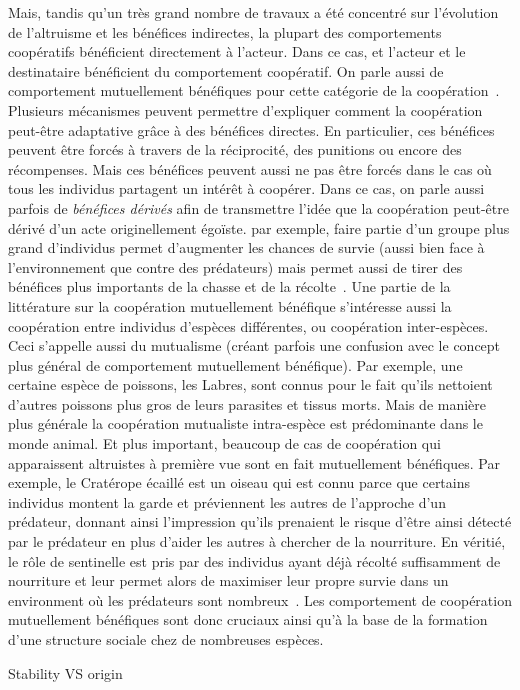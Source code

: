 		Mais, tandis qu'un très grand nombre de travaux a été concentré sur l'évolution de l'altruisme et les bénéfices indirectes, la plupart des comportements coopératifs bénéficient directement à l'acteur. Dans ce cas, et l'acteur et le destinataire bénéficient du comportement coopératif. On parle aussi de comportement mutuellement bénéfiques pour cette catégorie de la coopération~\parencite{Bergmuller2007a}. Plusieurs mécanismes peuvent permettre d'expliquer comment la coopération peut-être adaptative grâce à des bénéfices directes. En particulier, ces bénéfices peuvent être forcés à travers de la réciprocité, des punitions ou encore des récompenses. Mais ces bénéfices peuvent aussi ne pas être forcés dans le cas où tous les individus partagent un intérêt à coopérer. Dans ce cas, on parle aussi parfois de \emph{bénéfices dérivés} afin de transmettre l'idée que la coopération peut-être dérivé d'un acte originellement égoïste. par exemple, faire partie d'un groupe plus grand d'individus permet d'augmenter les chances de survie (aussi bien face à l'environnement que contre des prédateurs) mais permet aussi de tirer des bénéfices plus importants de la chasse et de la récolte~\parencite{Clutton-Brock2002}. Une partie de la littérature sur la coopération mutuellement bénéfique s'intéresse aussi la coopération entre individus d'espèces différentes, ou coopération inter-espèces. Ceci s'appelle aussi du mutualisme (créant parfois une confusion avec le concept plus général de comportement mutuellement bénéfique). Par exemple, une certaine espèce de poissons, les Labres, sont connus pour le fait qu'ils nettoient d'autres poissons plus gros de leurs parasites et tissus morts. Mais de manière plus générale la coopération mutualiste intra-espèce est prédominante dans le monde animal. Et plus important, beaucoup de cas de coopération qui apparaissent altruistes à première vue sont en fait mutuellement bénéfiques. Par exemple, le Cratérope écaillé est un oiseau qui est connu parce que certains individus montent la garde et préviennent les autres de l'approche d'un prédateur, donnant ainsi l'impression qu'ils prenaient le risque d'être ainsi détecté par le prédateur en plus d'aider les autres à chercher de la nourriture. En véritié, le rôle de sentinelle est pris par des individus ayant déjà récolté suffisamment de nourriture et leur permet alors de maximiser leur propre survie dans un environment où les prédateurs sont nombreux~\parencite{Wright2001, Clutton-Brock2002}. Les comportement de coopération mutuellement bénéfiques sont donc cruciaux ainsi qu'à la base de la formation d'une structure sociale chez de nombreuses espèces.

		Stability VS origin